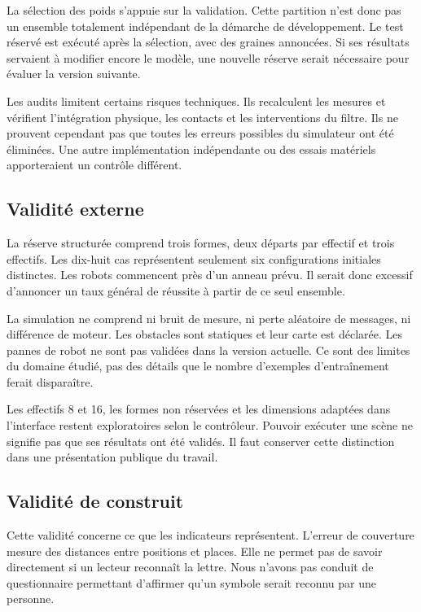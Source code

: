 La sélection des poids s'appuie sur la validation. Cette partition n'est donc pas un ensemble totalement indépendant de la démarche de développement. Le test réservé est exécuté après la sélection, avec des graines annoncées. Si ses résultats servaient à modifier encore le modèle, une nouvelle réserve serait nécessaire pour évaluer la version suivante.

Les audits limitent certains risques techniques. Ils recalculent les mesures et vérifient l'intégration physique, les contacts et les interventions du filtre. Ils ne prouvent cependant pas que toutes les erreurs possibles du simulateur ont été éliminées. Une autre implémentation indépendante ou des essais matériels apporteraient un contrôle différent.

\subsection*{Validité externe}
{}
La réserve structurée comprend trois formes, deux départs par effectif et trois effectifs. Les dix-huit cas représentent seulement six configurations initiales distinctes. Les robots commencent près d'un anneau prévu. Il serait donc excessif d'annoncer un taux général de réussite à partir de ce seul ensemble.

La simulation ne comprend ni bruit de mesure, ni perte aléatoire de messages, ni différence de moteur. Les obstacles sont statiques et leur carte est déclarée. Les pannes de robot ne sont pas validées dans la version actuelle. Ce sont des limites du domaine étudié, pas des détails que le nombre d'exemples d'entraînement ferait disparaître.

Les effectifs 8 et 16, les formes non réservées et les dimensions adaptées dans l'interface restent exploratoires selon le contrôleur. Pouvoir exécuter une scène ne signifie pas que ses résultats ont été validés. Il faut conserver cette distinction dans une présentation publique du travail.

\subsection*{Validité de construit}
{}
Cette validité concerne ce que les indicateurs représentent. L'erreur de couverture mesure des distances entre positions et places. Elle ne permet pas de savoir directement si un lecteur reconnaît la lettre. Nous n'avons pas conduit de questionnaire permettant d'affirmer qu'un symbole serait reconnu par une personne.

